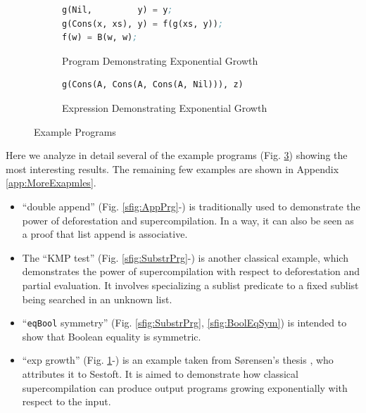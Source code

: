 \documentclass[submission,copyright,creativecommons]{eptcs}
\begin{document}
\begin{figure}
\begin{subfigure}[b]{\linewidth}
\begin{lstlisting}[language=Lisp,keywords={}]
g(Nil,         y) = y;
g(Cons(x, xs), y) = f(g(xs, y));
f(w) = B(w, w);
\end{lstlisting}
\caption{Program Demonstrating Exponential Growth}
\label{sfig:ExpGrowthPrg}
\end{subfigure}

\begin{subfigure}[b]{\linewidth}
\begin{lstlisting}[language=Lisp,keywords={}]
g(Cons(A, Cons(A, Cons(A, Nil))), z)
\end{lstlisting}
\caption{Expression Demonstrating Exponential Growth}
\label{sfig:ExpGrowth}
\end{subfigure}

\caption{Example Programs}\label{fig:Examples}
\end{figure}

Here we analyze in detail several of the example programs (Fig. \ref{fig:Examples}) showing the most interesting results.
The remaining few examples are shown in Appendix \ref{app:MoreExapmles}.
\begin{itemize}
  \item ``double append'' (Fig. \ref{sfig:AppPrg}-) is traditionally used to 
    demonstrate the power of deforestation and supercompilation.
    In a way, it can also be seen as a proof that list append is associative.
  \item The ``KMP test'' (Fig. \ref{sfig:SubstrPrg}-) is another classical example, 
    which demonstrates the power of supercompilation with respect to deforestation and partial evaluation.
    It involves specializing a sublist predicate to a fixed sublist being
    searched in an unknown list.
  \item ``\verb|eqBool| symmetry'' (Fig. \ref{sfig:SubstrPrg}, \ref{sfig:BoolEqSym}) is intended
    to show that Boolean equality is symmetric.
  \item ``exp growth'' (Fig. \ref{sfig:ExpGrowthPrg}-) is an example taken 
    from S{\o}rensen's thesis \cite[Example 11.4.1]{Sorensen1994TurchinSupercompiler}, who attributes it to Sestoft.
    It is aimed to demonstrate how classical supercompilation can produce output programs
    growing exponentially with respect to the input.
\end{itemize}
\end{document}
